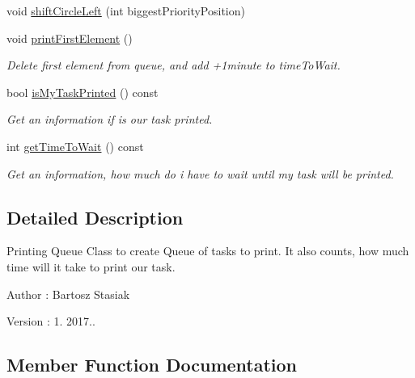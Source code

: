 \begin{DoxyCompactItemize}
void \hyperlink{class_printing_queue_a6e0a48416ddf06b841e1bae87ded0ab6}{shift\+Circle\+Left} (int biggest\+Priority\+Position)
\item 
\mbox{\label{class_printing_queue_aa2604075870694f7bd03631303e1405c}} 
void \hyperlink{class_printing_queue_aa2604075870694f7bd03631303e1405c}{print\+First\+Element} ()
\begin{DoxyCompactList}\small\item\em Delete first element from queue, and add +1minute to time\+To\+Wait. \end{DoxyCompactList}\item 
bool \hyperlink{class_printing_queue_aa0081c56e8ff9fc7acbc8eb0c552f61c}{is\+My\+Task\+Printed} () const
\begin{DoxyCompactList}\small\item\em Get an information if is our task printed. \end{DoxyCompactList}\item 
int \hyperlink{class_printing_queue_ad677a39d56b5ee403e88f4e32da606e4}{get\+Time\+To\+Wait} () const
\begin{DoxyCompactList}\small\item\em Get an information, how much do i have to wait until my task will be printed. \end{DoxyCompactList}\end{DoxyCompactItemize}


\subsection{Detailed Description}
Printing Queue Class to create Queue of tasks to print. It also counts, how much time will it take to print our task. 

\begin{DoxyAuthor}{Author}
\+: Bartosz Stasiak 
\end{DoxyAuthor}
\begin{DoxyVersion}{Version}
\+: 1. 2017.. 
\end{DoxyVersion}


\subsection{Member Function Documentation}
\mbox{\label{class_printing_queue_a5da114a3b589a9511b1888a42c4cab92}} 
